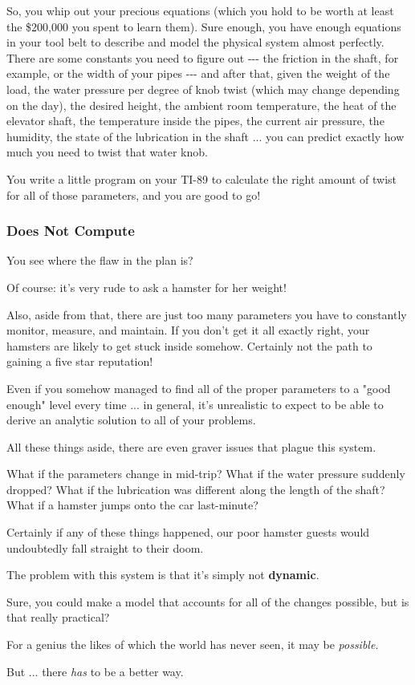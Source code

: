 \documentclass[]{article}
\begin{document}
So, you whip out your precious equations (which you hold to be worth at least
the \$200,000 you spent to learn them). Sure enough, you have enough equations
in your tool belt to describe and model the physical system almost perfectly.
There are some constants you need to figure out -\/-\/- the friction in the
shaft, for example, or the width of your pipes -\/-\/- and after that, given the
weight of the load, the water pressure per degree of knob twist (which may
change depending on the day), the desired height, the ambient room temperature,
the heat of the elevator shaft, the temperature inside the pipes, the current
air pressure, the humidity, the state of the lubrication in the shaft ... you
can predict exactly how much you need to twist that water knob.

You write a little program on your TI-89 to calculate the right amount of twist
for all of those parameters, and you are good to go!

\subsubsection{Does Not Compute}

You see where the flaw in the plan is?

Of course: it's very rude to ask a hamster for her weight!

Also, aside from that, there are just too many parameters you have to constantly
monitor, measure, and maintain. If you don't get it all exactly right, your
hamsters are likely to get stuck inside somehow. Certainly not the path to
gaining a five star reputation!

Even if you somehow managed to find all of the proper parameters to a "good
enough" level every time ... in general, it's unrealistic to expect to be able
to derive an analytic solution to all of your problems.

All these things aside, there are even graver issues that plague this system.

What if the parameters change in mid-trip? What if the water pressure suddenly
dropped? What if the lubrication was different along the length of the shaft?
What if a hamster jumps onto the car last-minute?

Certainly if any of these things happened, our poor hamster guests would
undoubtedly fall straight to their doom.

The problem with this system is that it's simply not \textbf{dynamic}.

Sure, you could make a model that accounts for all of the changes possible, but
is that really practical?

For a genius the likes of which the world has never seen, it may be
\emph{possible}.

But ... there \emph{has} to be a better way.
\end{document}

